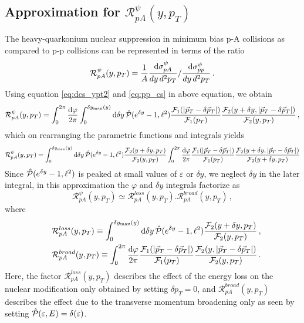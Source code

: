 \documentclass[11pt,onecolumn]{article}
\newcommand{\dd}{{\rm d}}
\newcommand{\beq}{\begin{equation}}
\newcommand{\eeq}{\end{equation}}
\newcommand{\bqa}{\begin{eqnarray}}
\newcommand{\eqa}{\end{eqnarray}}
\begin{document}
\subsection{Approximation for $\mathcal{R}^\psi_{pA} (y,p_T)$}
The heavy-quarkonium nuclear suppression in minimum bias p-A collisions as compared to p-p collisions can be represented in terms of the ratio
%
\beq
\mathcal{R}^\psi_{pA} (y, p_T) = \frac{1}{A} \frac{\dd \sigma^\psi_{pA}}{dy \, d^2p_T} / \frac{\dd \sigma^\psi_{pp}}{dy \, d^2p_T} \, .
\eeq
%
Using equation \eqref{eq:dcs_ypt2} and \eqref{eq:pp_cs} in above equation, we obtain
%
\beq
\mathcal{R}^\psi_{pA} (y, p_T) =  \int_{0}^{2\pi} \frac{\dd \varphi}{2\pi} \int_0^{\delta y_{\rm max}(y)} \dd \delta y \,\hat{\cal P}(e^{\delta y} - 1, \ell^2) \frac{\mathcal{F}_1(| \vec{p}_T - \delta \vec{p}_T |)}{\mathcal{F}_1(p_T)} \frac{\mathcal{F}_2(y+\delta y, | \vec{p}_T - \delta \vec{p}_T |)}{\mathcal{F}_2(y,p_T)} \, ,
\eeq
%
which on rearranging the parametric functions and integrals yields
\beq
\mathcal{R}^\psi_{pA} (y, p_T) =  \int_0^{\delta y_{\rm max}(y)} \dd \delta y \,\hat{\cal P}(e^{\delta y} - 1, \ell^2)  \frac{\mathcal{F}_2(y+\delta y, p_T)}{\mathcal{F}_2(y, p_T)}  \int_{0}^{2\pi} \frac{\dd \varphi}{2\pi}  \frac{\mathcal{F}_1(| \vec{p}_T - \delta \vec{p}_T |)}{\mathcal{F}_1(p_T)}  \frac{\mathcal{F}_2(y+\delta y, | \vec{p}_T - \delta \vec{p}_T |)}{\mathcal{F}_2(y+\delta y, p_T)} 
\label{eq:raa_vs_y_pt2}
\eeq
%
Since $\hat{\cal P}(e^{\delta y} - 1, \ell^2)$ is peaked at small values of $\varepsilon$ or $\delta y$, we neglect $\delta y$ in the later integral, in this approximation the $\varphi$ and $\delta y$ integrals factorize as
%
\beq
\mathcal{R}^{\psi}_{pA} (y, p_T) \simeq \mathcal{R}^{loss}_{pA} (y, p_T) . \mathcal{R}^{broad}_{pA} (y, p_T) \, , 
\eeq
%
where
%
\bqa
&& \mathcal{R}^{loss}_{pA} (y, p_T) \equiv \int_0^{\delta y_{\rm max}(y)} \dd \delta y \,\hat{\cal P}(e^{\delta y} - 1, \ell^2)  \frac{\mathcal{F}_2(y+\delta y, p_T)}{\mathcal{F}_2(y, p_T)} \, , \\
&& \mathcal{R}^{broad}_{pA} (y, p_T) \equiv \int_{0}^{2\pi} \frac{\dd \varphi}{2\pi}  \frac{\mathcal{F}_1(| \vec{p}_T - \delta \vec{p}_T |)}{\mathcal{F}_1(p_T)}  \frac{\mathcal{F}_2(y, | \vec{p}_T - \delta \vec{p}_T |)}{\mathcal{F}_2(y, p_T)} \, .
\eqa
%
Here, the factor $\mathcal{R}^{loss}_{pA} (y, p_T) $ describes the effect of the energy loss on the nuclear modification only obtained by setting $\delta p_T = 0$, and $\mathcal{R}^{broad}_{pA} (y, p_T)$ describes the effect due to the transverse momentum broadening only as seen by setting $\hat{\cal P}(\varepsilon, E) = \delta (\varepsilon) $.
\end{document}
